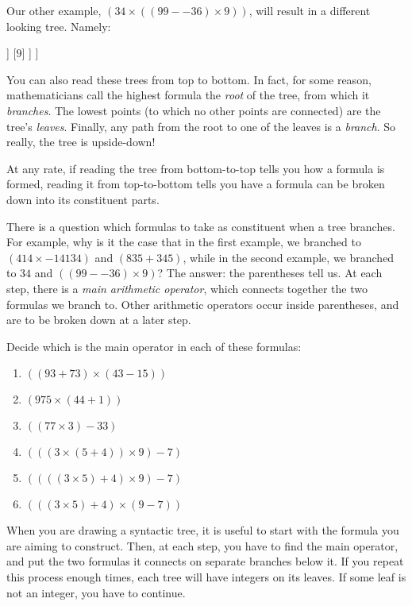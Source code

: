 Our other example, $(34 \times ((99- -36)\times 9))$, will result in a different looking tree. Namely:

\begin{center}
\begin{forest}
	[$(34 \times ((99- -36)\times 9))$
		[$34$]
		[$((99- -36)\times 9)$
			[$(99- -36)$
				[$99$]
				[$-36$]
			]
			[$9$]
		]
	]
\end{forest}
\end{center}

You can also read these trees from top to bottom. In fact, for some reason, mathematicians call the highest formula the \textit{root} of the tree, from which it \textit{branches}. The lowest points (to which no other points are connected) are the tree's \textit{leaves}. Finally, any path from the root to one of the leaves is a \textit{branch}. So really, the tree is upside-down! 

At any rate, if reading the tree from bottom-to-top tells you how a formula is formed, reading it from top-to-bottom tells you have a formula can be broken down into its constituent parts. 

There is a question which formulas to take as constituent when a tree branches. For example, why is it the case that in the first example, we branched to $(414 \times -14134)$ and $(835+345)$, while in the second example, we branched to $34$ and $((99- -36)\times 9)$? The answer: the parentheses tell us. At each step, there is a \textit{main arithmetic operator}, which connects together the two formulas we branch to. Other arithmetic operators occur inside parentheses, and are to be broken down at a later step. 

\begin{exc} \label{lae}
Decide which is the main operator in each of these formulas:

\begin{enumerate}
	\item $((93+73)\times(43-15))$
	\item $(975 \times (44+1))$
	\item $((77\times 3)- 33)$
	\item $(((3 \times (5+4)) \times 9)-7)$
	\item $((((3 \times 5)+4) \times 9)-7)$
	\item $(((3 \times 5)+4) \times (9-7))$
\end{enumerate}
\end{exc}

When you are drawing a syntactic tree, it is useful to start with the formula you are aiming to construct. Then, at each step, you have to find the main operator, and put the two formulas it connects on separate branches below it. If you repeat this process enough times, each tree will have integers on its leaves. If some leaf is not an integer, you have to continue. 

